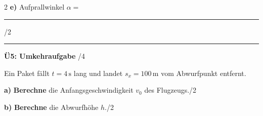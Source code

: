 \documentclass[10pt, a4paper]{article}
\newcommand{\fachfarbe}{physik}
\newcommand{\luecke}[1]{\rule{#1}{0.4pt}}
\newcommand{\punkte}[1]{\hfill\small\textcolor{grau}{/#1}}
\newcommand{\abschnitt}[1]{%
    \vspace{4pt}
    \noindent\textbf{\textcolor{\fachfarbe}{#1}}
    \vspace{2pt}
}
\begin{document}
\begin{multicols}{2}
\textbf{e)} Aufprallwinkel $\alpha = $ \luecke{2cm} \hfill\textcolor{grau}{\small/2}

\vspace{0.4cm}
\hrule
\vspace{4pt}


\abschnitt{Ü5: Umkehraufgabe}\punkte{4}

Ein Paket fällt $t = 4\,\text{s}$ lang und landet $s_x = 100\,\text{m}$ vom Abwurfpunkt entfernt.

\textbf{a)} \textbf{Berechne} die Anfangsgeschwindigkeit $v_0$ des Flugzeugs.\hfill\textcolor{grau}{\small/2}

\vspace{1.2cm}

\textbf{b)} \textbf{Berechne} die Abwurfhöhe $h$.\hfill\textcolor{grau}{\small/2}

\vspace{1.2cm}

\end{multicols}


\newpage
\end{document}
